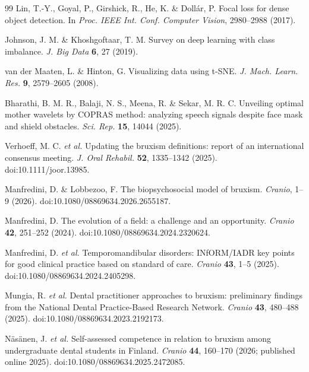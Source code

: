 \documentclass[pdflatex,sn-nature,iicol]{sn-jnl}
\begin{document}
\begin{thebibliography}{99}
\color{blue}
Lin, T.-Y., Goyal, P., Girshick, R., He, K. \& Doll\'ar, P. Focal loss for dense object detection. In \emph{Proc. IEEE Int. Conf. Computer Vision}, 2980--2988 (2017).
\color{black}

\color{blue}
Johnson, J. M. \& Khoshgoftaar, T. M. Survey on deep learning with class imbalance. \emph{J. Big Data} \textbf{6}, 27 (2019).
\color{black}

\color{blue}
van der Maaten, L. \& Hinton, G. Visualizing data using t-SNE. \emph{J. Mach. Learn. Res.} \textbf{9}, 2579--2605 (2008).
\color{black}

\color{blue}
Bharathi, B. M. R., Balaji, N. S., Meena, R. \& Sekar, M. R. C. Unveiling optimal mother wavelets by COPRAS method: analyzing speech signals despite face mask and shield obstacles. \emph{Sci. Rep.} \textbf{15}, 14044 (2025).
\color{black}

\color{blue}
Verhoeff, M. C. \emph{et al.} Updating the bruxism definitions: report of an international consensus meeting. \emph{J. Oral Rehabil.} \textbf{52}, 1335--1342 (2025). doi:10.1111/joor.13985.
\color{black}

\color{blue}
Manfredini, D. \& Lobbezoo, F. The biopsychosocial model of bruxism. \emph{Cranio}, 1--9 (2026). doi:10.1080/08869634.2026.2655187.

Manfredini, D. The evolution of a field: a challenge and an opportunity. \emph{Cranio} \textbf{42}, 251--252 (2024). doi:10.1080/08869634.2024.2320624.

Manfredini, D. \emph{et al.} Temporomandibular disorders: INfORM/IADR key points for good clinical practice based on standard of care. \emph{Cranio} \textbf{43}, 1--5 (2025). doi:10.1080/08869634.2024.2405298.

Mungia, R. \emph{et al.} Dental practitioner approaches to bruxism: preliminary findings from the National Dental Practice-Based Research Network. \emph{Cranio} \textbf{43}, 480--488 (2025). doi:10.1080/08869634.2023.2192173.

N\"as\"anen, J. \emph{et al.} Self-assessed competence in relation to bruxism among undergraduate dental students in Finland. \emph{Cranio} \textbf{44}, 160--170 (2026; published online 2025). doi:10.1080/08869634.2025.2472085.


\end{thebibliography}
\end{document}
